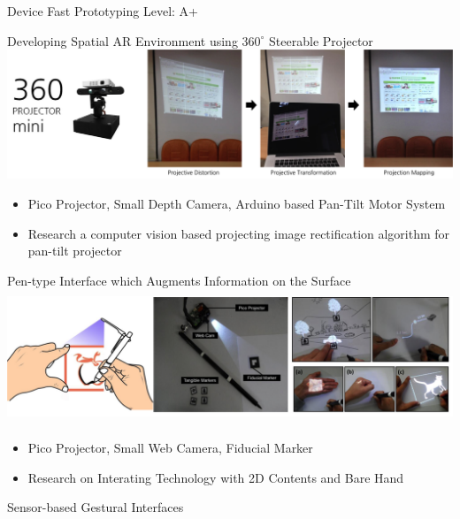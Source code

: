 \begin{cventries}
  \cventry
    {Device Fast Prototyping} %
    {} %
    {} %
    {Level: A+} %
    {
      \begin{cvitems} %
        \item {Developing Spatial AR Environment using $360^{\circ}$ Steerable Projector \\
          \includegraphics[width=\linewidth]{cv/resources/pervasiveAR.png}
          \begin{itemize}
              \item {Pico Projector, Small Depth Camera, Arduino based Pan-Tilt Motor System}
              \item {Research a computer vision based projecting image rectification algorithm for pan-tilt projector}
          \end{itemize}
        }
        \item {Pen-type Interface which Augments Information on the Surface \\
          \includegraphics[width=\linewidth, height=40mm]{cv/resources/augpen.png}
          \begin{itemize}
            \item {Pico Projector, Small Web Camera, Fiducial Marker}
            \item {Research on Interating Technology with 2D Contents and Bare Hand}
          \end{itemize}
        }
        \item {Sensor-based Gestural Interfaces \\
}
\end{cvitems}}
\end{cventries}
